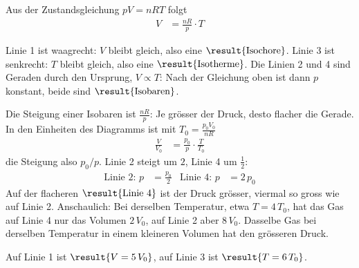 Aus der Zustandsgleichung $pV = nRT$ folgt
\begin{align}
 V &= \frac{nR}{p}\cdot T
\end{align}
\begin{abcliste}
\abc Linie 1 ist waagrecht: $V$ bleibt gleich, also eine $\result{\text{Isochore}}$. Linie 3 ist senkrecht: $T$ bleibt gleich, also eine $\result{\text{Isotherme}}$. Die Linien 2 und 4 sind Geraden durch den Ursprung, $V \propto T$: Nach der Gleichung oben ist dann $p$ konstant, beide sind $\result{\text{Isobaren}}$.

\abc Die Steigung einer Isobaren ist $\frac{nR}{p}$: Je grösser der Druck, desto flacher die Gerade. In den Einheiten des Diagramms ist mit $T_0 = \frac{p_0V_0}{nR}$
\begin{align}
 \frac{V}{V_0} &= \frac{p_0}{p}\cdot\frac{T}{T_0}
\end{align}
die Steigung also $p_0/p$. Linie 2 steigt um $2$, Linie 4 um $\frac12$:
\begin{align}
 \text{Linie 2: } p &= \frac{p_0}{2} & \text{Linie 4: } p &= 2\,p_0
\end{align}
Auf der flacheren $\result{\text{Linie 4}}$ ist der Druck grösser, viermal so gross wie auf Linie 2. Anschaulich: Bei derselben Temperatur, etwa $T = 4\,T_0$, hat das Gas auf Linie 4 nur das Volumen $2\,V_0$, auf Linie 2 aber $8\,V_0$. Dasselbe Gas bei derselben Temperatur in einem kleineren Volumen hat den grösseren Druck.

\abc Auf Linie 1 ist $\result{V = 5\,V_0}$, auf Linie 3 ist $\result{T = 6\,T_0}$.
\end{abcliste}
